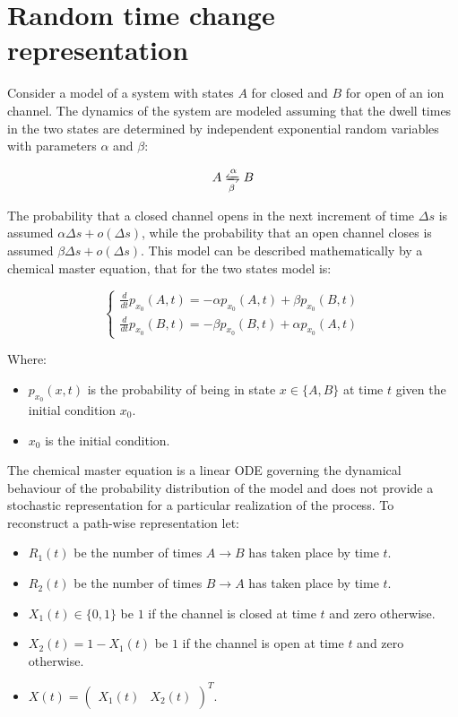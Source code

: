 \begin{abstract}
\end{abstract}


\section{Random time change representation}
Consider a model of a system with states $A$ for closed and $B$ for open of an ion channel.
The dynamics of the system are modeled assuming that the dwell times in the two states are determined by independent exponential random variables with parameters $\alpha$ and $\beta$:

$$A\xleftrightharpoons[\beta]{\alpha}B$$

The probability that a closed channel opens in the next increment of time $\Delta s$ is assumed $\alpha\Delta s + o(\Delta s)$, while the probability that an open channel closes is assumed $\beta\Delta s + o(\Delta s)$.
This model can be described mathematically by a chemical master equation, that for the two states model is:

$$\begin{cases}\frac{d}{dt}p_{x_0}(A, t) = -\alpha p_{x_0}(A, t) + \beta p_{x_0}(B, t)\\\frac{d}{dt}p_{x_0}(B, t) = -\beta p_{x_0}(B, t) + \alpha p_{x_0}(A, t)\end{cases}$$

Where:

\begin{itemize}
	\item $p_{x_0}(x, t)$ is the probability of being in state $x\in \{A, B\}$ at time $t$ given the initial condition $x_0$.
	\item $x_0$ is the initial condition.
\end{itemize}

The chemical master equation is a linear ODE governing the dynamical behaviour of the probability distribution of the model and does not provide a stochastic representation for a particular realization of the process.
To reconstruct  a path-wise representation let:

\begin{itemize}
	\item $R_1(t)$ be the number of times $A\rightarrow B$ has taken place by time $t$.
	\item $R_2(t)$ be the number of times $B\rightarrow A$ has taken place by time $t$.
	\item $X_1(t)\in\{0,1\}$ be $1$ if the channel is closed at time $t$ and zero otherwise.
	\item $X_2(t)=1-X_1(t)$ be $1$ if the channel is open at time $t$ and zero otherwise.
	\item $X(t) = \begin{pmatrix}X_1(t) & X_2(t)\end{pmatrix}^T$.
\end{itemize}


